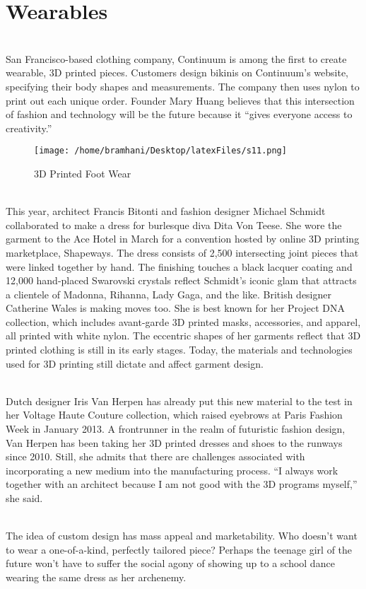 \documentclass[12pt,a4paper]{report}
\begin{document}
	\section{Wearables}
	
	\indent
	\\San Francisco-based clothing company, Continuum is among the first to create wearable, 3D
	printed pieces. Customers design bikinis on Continuum’s website, specifying their body shapes and
	measurements. The company then uses nylon to print out each unique order. Founder Mary Huang
	believes that this intersection of fashion and technology will be the future because it “gives
	everyone access to creativity.”\par
	
	\begin{figure}[H]
		\centering
		\texttt{[image: /home/bramhani/Desktop/latexFiles/s11.png]}
		\label{fig:3D Printed Foot Wear}
		\caption{3D Printed Foot Wear}
	\end{figure}
	\indent
	\\This year, architect Francis Bitonti and fashion designer Michael Schmidt collaborated to
	make a dress for burlesque diva Dita Von Teese. She wore the garment to the Ace Hotel in March
	for a convention hosted by online 3D printing marketplace, Shapeways. The dress consists of 2,500
	intersecting joint pieces that were linked together by hand. The finishing touches a black lacquer
	coating and 12,000 hand-placed Swarovski crystals reflect Schmidt’s iconic glam that attracts a
	clientele of Madonna, Rihanna, Lady Gaga, and the like. British designer Catherine Wales is
	making moves too. She is best known for her Project DNA collection, which includes avant-garde
	3D printed masks, accessories, and apparel, all printed with white nylon. The eccentric shapes of
	her garments reflect that 3D printed clothing is still in its early stages. Today, the materials and
	technologies used for 3D printing still dictate and affect garment design.\par
	\indent
	\\Dutch designer Iris Van Herpen has already put this new material to the test in her Voltage
	Haute Couture collection, which raised eyebrows at Paris Fashion Week in January 2013. A
	frontrunner in the realm of futuristic fashion design, Van Herpen has been taking her 3D printed
	dresses and shoes to the runways since 2010. Still, she admits that there are challenges associated
	with incorporating a new medium into the manufacturing process. “I always work together with an
	architect because I am not good with the 3D programs myself,” she said.\par
	\indent
	\\The idea of custom design has mass appeal and marketability. Who doesn’t want to wear a
	one-of-a-kind, perfectly tailored piece? Perhaps the teenage girl of the future won’t have to suffer
	the social agony of showing up to a school dance wearing the same dress as her archenemy.\par
	
\end{document}
